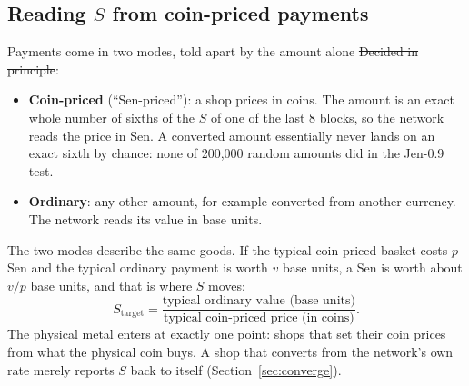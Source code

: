 \subsection{Reading $S$ from coin-priced payments}
Payments come in two modes, told apart by the amount alone \st{Decided in principle}:
\begin{itemize}
\item \textbf{Coin-priced} (``Sen-priced''): a shop prices in coins. The amount is an exact whole number of sixths of the $S$ of one of the last 8 blocks, so the network reads the price in Sen. A converted amount essentially never lands on an exact sixth by chance: none of 200,000 random amounts did in the Jen-0.9 test.
\item \textbf{Ordinary}: any other amount, for example converted from another currency. The network reads its value in base units.
\end{itemize}

The two modes describe the same goods. If the typical coin-priced basket costs $p$ Sen and the typical ordinary payment is worth $v$ base units, a Sen is worth about $v/p$ base units, and that is where $S$ moves:
\begin{equation}
S_{\text{target}} = \frac{\text{typical ordinary value (base units)}}{\text{typical coin-priced price (in coins)}} .
\end{equation}
The physical metal enters at exactly one point: shops that set their coin prices from what the physical coin buys. A shop that converts from the network's own rate merely reports $S$ back to itself (Section~\ref{sec:converge}).

